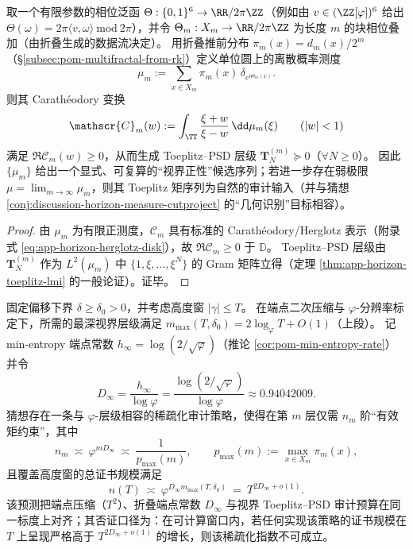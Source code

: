\begin{proposition}\label{prop:discussion-horizon-measure-fold6-pushforward}
取一个有限参数的相位泛函 \(\Theta:\{0,1\}^6\to\RR/2\pi\ZZ\)（例如由 \(v\in(\ZZ[\varphi])^6\) 给出 \(\Theta(\omega)=2\pi\langle v,\omega\rangle\ \mathrm{mod}\ 2\pi\)），并令 \(\Theta_m:X_m\to\RR/2\pi\ZZ\) 为长度 \(m\) 的块相位叠加（由折叠生成的数据流决定）。
用折叠推前分布 \(\pi_m(x)=d_m(x)/2^m\)（\S\ref{subsec:pom-multifractal-from-rk}）定义单位圆上的离散概率测度
\[
\mu_m:=\sum_{x\in X_m}\pi_m(x)\,\delta_{e^{\mathrm{i}\Theta_m(x)}}.
\]
则其 Carath\'eodory 变换
\[
\mathscr{C}_m(w):=\int_{\TT}\frac{\xi+w}{\xi-w}\,\dd\mu_m(\xi)
\qquad(|w|<1)
\]
满足 \(\Re\mathscr{C}_m(w)\ge 0\)，从而生成 Toeplitz--PSD 层级 \(\mathbf{T}^{(m)}_N\succeq 0\)（\(\forall N\ge 0\)）。
因此 \(\{\mu_m\}\) 给出一个显式、可复算的“视界正性”候选序列；若进一步存在弱极限 \(\mu=\lim_{m\to\infty}\mu_m\)，则其 Toeplitz 矩序列为自然的审计输入（并与猜想 \ref{conj:discussion-horizon-measure-cutproject} 的“几何识别”目标相容）。
\end{proposition}
\begin{proof}
由 \(\mu_m\) 为有限正测度，\(\mathscr{C}_m\) 具有标准的 Carath\'eodory/Herglotz 表示（附录式 \eqref{eq:app-horizon-herglotz-disk}），故 \(\Re\mathscr{C}_m\ge 0\) 于 \(\mathbb{D}\)。
Toeplitz--PSD 层级由 \(\mathbf{T}^{(m)}_N\) 作为 \(L^2(\mu_m)\) 中 \(\{1,\xi,\dots,\xi^N\}\) 的 Gram 矩阵立得（定理 \ref{thm:app-horizon-toeplitz-lmi} 的一般论证）。证毕。
\end{proof}

\begin{conjecture}\label{conj:discussion-phi-sparsified-toeplitz-audit}
固定偏移下界 \(\delta\ge\delta_0>0\)，并考虑高度窗 \(|\gamma|\le T\)。
在端点二次压缩与 \(\varphi\)-分辨率标定下，所需的最深视界层级满足 \(m_{\max}(T,\delta_0)=2\log_{\varphi}T+O(1)\)（上段）。
记 min-entropy 端点常数 \(h_\infty=\log(2/\sqrt\varphi)\)（推论 \ref{cor:pom-min-entropy-rate}）并令
\[
D_\infty=\frac{h_\infty}{\log\varphi}=\frac{\log(2/\sqrt\varphi)}{\log\varphi}\approx 0.94042009.
\]
猜想存在一条与 \(\varphi\)-层级相容的稀疏化审计策略，使得在第 \(m\) 层仅需 \(n_m\) 阶“有效矩约束”，其中
\[
n_m\ \asymp\ \varphi^{mD_\infty}\ \asymp\ \frac{1}{p_{\max}(m)},
\qquad
p_{\max}(m):=\max_{x\in X_m}\pi_m(x),
\]
且覆盖高度窗的总证书规模满足
\[
n(T)\ \asymp\ \varphi^{D_\infty m_{\max}(T,\delta_0)}\ =\ T^{2D_\infty+o(1)}.
\]
该预测把端点压缩（\(T^2\)）、折叠端点常数 \(D_\infty\) 与视界 Toeplitz--PSD 审计预算在同一标度上对齐；其否证口径为：在可计算窗口内，若任何实现该策略的证书规模在 \(T\) 上呈现严格高于 \(T^{2D_\infty+o(1)}\) 的增长，则该稀疏化指数不可成立。
\end{conjecture}

